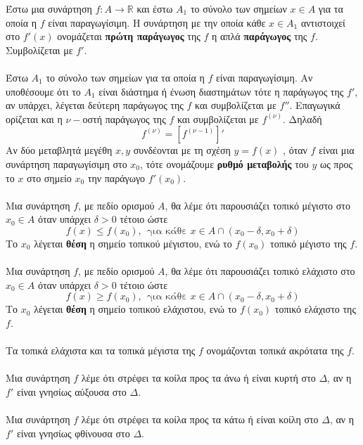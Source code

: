 \documentclass[ektypwsh]{frontisthrio}
\begin{document}
Έστω μια συνάρτηση $ f:Α\to\mathbb{R} $ και έστω $ A_1 $ το σύνολο των σημείων $ x\in A $ για τα οποία η $ f $ είναι παραγωγίσιμη. Η συνάρτηση με την οποία κάθε $ x\in A_1 $ αντιστοιχεί στο $ f'(x) $ ονομάζεται \textbf{πρώτη παράγωγος} της $ f $ η απλά \textbf{παράγωγος} της $ f $. Συμβολίζεται με $ f' $.\\\\
Έστω $ A_1 $  το σύνολο των σημείων για τα οποία η $ f $ είναι παραγωγίσιμη. Αν υποθέσουμε ότι το $ A_1 $ είναι διάστημα ή ένωση διαστημάτων τότε η παράγωγος της $ f' $, αν υπάρχει, λέγεται δεύτερη παράγωγος της $ f $ και συμβολίζεται με $ f'' $. Επαγωγικά ορίζεται και η $ \nu- $οστή παράγωγος της $ f $ και συμβολίζεται με $ f^{(\nu)} $. Δηλαδή
\[ f^{(\nu)}=\left[f^{(\nu-1)}\right]' \]
Αν δύο μεταβλητά μεγέθη  $ x , y $ συνδέονται με τη σχέση $ y = f(x) $ , όταν  $ f  $ είναι μια συνάρτηση παραγωγίσιμη στο $ x_0 $, τότε ονομάζουμε \textbf{ρυθμό μεταβολής} του $ y $ ως προς το $ x $ στο σημείο  $ x_0 $ την παράγωγο $ f '(x_0) $.\\\\
Μια συνάρτηση $ f $, με πεδίο ορισμού $ A $, θα λέμε ότι παρουσιάζει τοπικό μέγιστο στο $ x_0\in A $ όταν υπάρχει $ \delta>0 $ τέτοιο ώστε
\[ f(x)\leq f(x_0), \ \ \textrm{για κάθε }x\in A\cap(x_0-\delta,x_0+\delta) \]
Το $ x_0 $ λέγεται \textbf{θέση} η σημείο τοπικού μέγιστου, ενώ το $ f(x_0) $ τοπικό μέγιστο της $ f $.\\\\
Μια συνάρτηση $ f $, με πεδίο ορισμού $ A $, θα λέμε ότι παρουσιάζει τοπικό ελάχιστο στο $ x_0\in A $ όταν υπάρχει $ \delta>0 $ τέτοιο ώστε
\[ f(x)\geq f(x_0), \ \ \textrm{για κάθε }x\in A\cap(x_0-\delta,x_0+\delta) \]
Το $ x_0 $ λέγεται \textbf{θέση} η σημείο τοπικού ελάχιστου, ενώ το $ f(x_0) $ τοπικό ελάχιστο της $ f $.\\\\
Τα τοπικά ελάχιστα και τα τοπικά μέγιστα της $ f $ ονομάζονται τοπικά ακρότατα της $ f $.\\\\
Μια συνάρτηση $ f $ λέμε ότι στρέφει τα κοίλα προς τα άνω ή είναι κυρτή στο $ \Delta $, αν η $ f' $ είναι γνησίως αύξουσα στο $ \Delta $.\\\\
Μια συνάρτηση $ f $ λέμε ότι στρέφει τα κοίλα προς τα κάτω ή είναι κοίλη στο $ \Delta $, αν η $ f' $ είναι γνησίως φθίνουσα στο $ \Delta $.\\\\
\end{document}
